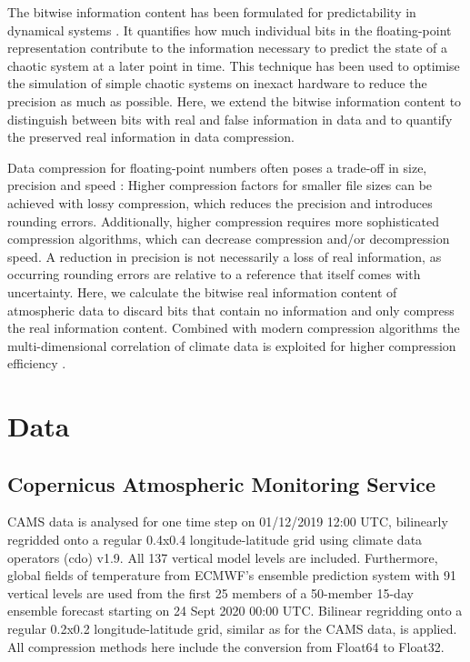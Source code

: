 The bitwise information content has been formulated for predictability in dynamical systems \citep{Jeffress2017}.
It quantifies how much individual bits in the floating-point representation contribute to the information necessary
to predict the state of a chaotic system at a later point in time. This technique has been used to optimise the
simulation of simple chaotic systems on inexact hardware to reduce the precision as much as possible. Here, we
extend the bitwise information content to distinguish between bits with real and false information in data and to
quantify the preserved real information in data compression. 

Data compression for floating-point numbers often poses a trade-off in size, precision and speed
\citep{Silver2017,Kuhn2016a,Hubbe2013}:
Higher compression factors for smaller file sizes can be achieved with lossy compression, which reduces
the precision and introduces rounding errors. Additionally, higher compression requires more sophisticated
compression algorithms, which can decrease compression and/or decompression speed. A reduction in
precision is not necessarily a loss of real information, as occurring rounding errors are relative to a reference
that itself comes with uncertainty. Here, we calculate the bitwise real information content \citep{Shannon1948,Jeffress2017,Kleeman2011}
of atmospheric data to discard bits that contain no information \citep{Zender2016,Kouznetsov2020} and only compress the real
information content. Combined with modern compression algorithms \citep{Lindstrom2014,Lindstrom2006} the multi-dimensional
correlation of climate data is exploited for higher compression efficiency \citep{Baker2016,Baker2019,Woodring2011}.

\section{Data}
\label{sec:compression_data}

\subsection{Copernicus Atmospheric Monitoring Service}

CAMS data is analysed for one time step on 01/12/2019 12:00 UTC, bilinearly regridded onto a regular 0.4\textdegree{}x0.4\textdegree{}
longitude-latitude grid using climate data operators (cdo) v1.9. All 137 vertical model levels are included.
Furthermore, global fields of temperature from ECMWF’s ensemble prediction system with 91 vertical levels are
used from the first 25 members of a 50-member 15-day ensemble forecast starting on 24 Sept 2020 00:00 UTC.
Bilinear regridding onto a regular 0.2\textdegree{}x0.2\textdegree{} longitude-latitude grid, similar as for the CAMS data, is applied.
All compression methods here include the conversion from Float64 to Float32.

